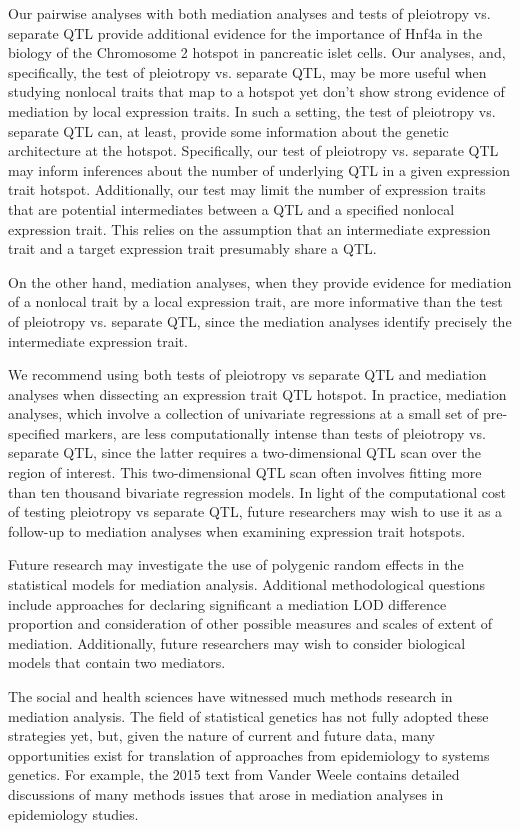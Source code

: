 \documentclass{article}
\begin{document}
\begin{boehm}
Our pairwise analyses with both mediation analyses and tests of pleiotropy vs. separate QTL provide additional evidence for the importance of Hnf4a in the biology of the Chromosome 2 hotspot in pancreatic islet cells. Our analyses, and, specifically, the test of pleiotropy vs. separate QTL, may be more useful when studying nonlocal traits that map to a hotspot yet don't show strong evidence of mediation by local expression traits. In such a setting, the test of pleiotropy vs. separate QTL can, at least, provide some information about the genetic architecture at the hotspot. Specifically, our test of pleiotropy vs. separate QTL may inform inferences about the number of underlying QTL in a given expression trait hotspot. Additionally, our test may limit the number of expression traits that are potential intermediates between a QTL and a specified nonlocal expression trait. This relies on the assumption that an intermediate expression trait and a target expression trait presumably share a QTL.

On the other hand, mediation analyses, when they provide evidence for mediation of a nonlocal trait by a local expression trait, are more informative than the test of pleiotropy vs. separate QTL, since the mediation analyses identify precisely the intermediate expression trait.

We recommend using both tests of pleiotropy vs separate QTL and mediation analyses when dissecting an expression trait QTL hotspot. In practice, mediation analyses, which involve a collection of univariate regressions at a small set of pre-specified markers, are less computationally intense than tests of pleiotropy vs. separate QTL, since the latter requires a two-dimensional QTL scan over the region of interest. This two-dimensional QTL scan often involves fitting more than ten thousand bivariate regression models. In light of the computational cost of testing pleiotropy vs separate QTL, future researchers may wish to use it as a follow-up to mediation analyses when examining expression trait hotspots.

Future research may investigate the use of polygenic random effects in the statistical models for mediation analysis. Additional methodological questions include approaches for declaring significant a mediation LOD difference proportion and consideration of other possible measures and scales of extent of mediation. Additionally, future researchers may wish to consider biological models that contain two mediators.

The social and health sciences have witnessed much methods research in  mediation analysis. The field of statistical genetics has not fully adopted these strategies yet, but, given the nature of current and future data, many opportunities exist for translation of approaches from epidemiology to systems genetics. For example, the 2015 text from Vander Weele contains detailed discussions of many methods issues that arose in mediation analyses in epidemiology studies.



\end{boehm}
\end{document}
